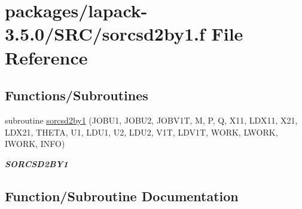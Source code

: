 \hypertarget{sorcsd2by1_8f}{}\section{packages/lapack-\/3.5.0/\+S\+R\+C/sorcsd2by1.f File Reference}
\label{sorcsd2by1_8f}
\subsection*{Functions/\+Subroutines}
\begin{DoxyCompactItemize}
\item 
subroutine \hyperlink{sorcsd2by1_8f_a2d57126590287389a69bc798fe36854f}{sorcsd2by1} (J\+O\+B\+U1, J\+O\+B\+U2, J\+O\+B\+V1\+T, M, P, Q, X11, L\+D\+X11, X21, L\+D\+X21, T\+H\+E\+T\+A, U1, L\+D\+U1, U2, L\+D\+U2, V1\+T, L\+D\+V1\+T, W\+O\+R\+K, L\+W\+O\+R\+K, I\+W\+O\+R\+K, I\+N\+F\+O)
\begin{DoxyCompactList}\small\item\em {\bfseries S\+O\+R\+C\+S\+D2\+B\+Y1} \end{DoxyCompactList}\end{DoxyCompactItemize}


\subsection{Function/\+Subroutine Documentation}
\hypertarget{sorcsd2by1_8f_a2d57126590287389a69bc798fe36854f}{}
